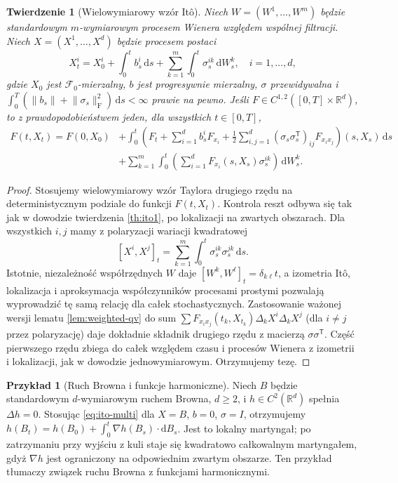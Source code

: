\documentclass[11pt,a4paper,oneside]{report}
\numberwithin{equation}{chapter}
\theoremstyle{plain}
\newtheorem{twierdzenie}{Twierdzenie}[chapter]
\theoremstyle{definition}
\newtheorem{przyklad}{Przykład}[chapter]
\theoremstyle{remark}
\newcommand{\R}{\mathbb{R}}
\newcommand{\calF}{\mathcal{F}}
\newcommand{\dd}{\mathrm{d}}
\newcommand{\norm}[1]{\lVert #1\rVert}
\begin{document}
\begin{twierdzenie}[Wielowymiarowy wzór Itô]\label{thm:volIII:03:04}
\label{th:ito-multi}
Niech $W=(W^1,\ldots,W^m)$ będzie standardowym
$m$-wymiarowym procesem Wienera względem wspólnej
filtracji. Niech $X=(X^1,\ldots,X^d)$ będzie procesem
postaci
\[
X_t^i=X_0^i+\int_0^t b_s^i\,\dd s
+\sum_{k=1}^{m}\int_0^t\sigma_s^{ik}\,\dd W_s^k,
\quad i=1,\ldots,d,
\]
gdzie $X_0$ jest $\calF_0$-mierzalny, $b$ jest
progresywnie mierzalny, $\sigma$ przewidywalna i
$\int_0^T(\norm{b_s}+\norm{\sigma_s}_{\mathrm F}^2)\,\dd s
<\infty$ prawie na pewno. Jeśli
$F\in C^{1,2}([0,T]\times\R^d)$, to z prawdopodobieństwem
jeden, dla wszystkich $t\in[0,T]$,
\[
\begin{split}
F(t,X_t)=F(0,X_0)&+\int_0^t\left(
F_t+\sum_{i=1}^d b_s^iF_{x_i}
+\frac12\sum_{i,j=1}^d(\sigma_s\sigma_s^{\mathsf T})_{ij}
F_{x_ix_j}\right)(s,X_s)\,\dd s\\
&+\sum_{k=1}^m\int_0^t
\left(\sum_{i=1}^dF_{x_i}(s,X_s)\sigma_s^{ik}\right)
\,\dd W_s^k.
\end{split}
\tag{3.6}\label{eq:ito-multi}
\]
\end{twierdzenie}
\begin{proof}
Stosujemy wielowymiarowy wzór Taylora drugiego rzędu
na deterministycznym podziale do funkcji $F(t,X_t)$.
Kontrola reszt odbywa się tak jak w dowodzie twierdzenia
\ref{th:ito1}, po lokalizacji na zwartych obszarach.
Dla wszystkich $i,j$ mamy z polaryzacji wariacji
kwadratowej
\[
[X^i,X^j]_t
=\sum_{k=1}^m\int_0^t\sigma_s^{ik}\sigma_s^{jk}\,\dd s.
\]
Istotnie, niezależność współrzędnych $W$ daje
$[W^k,W^\ell]_t=\delta_{k\ell}t$, a izometria Itô,
lokalizacja i aproksymacja współczynników procesami
prostymi pozwalają wyprowadzić tę samą relację dla
całek stochastycznych. Zastosowanie ważonej wersji
lematu \ref{lem:weighted-qv} do sum
$\sum F_{x_ix_j}(t_k,X_{t_k})\Delta_kX^i\Delta_kX^j$
(dla $i\ne j$ przez polaryzację) daje dokładnie
składnik drugiego rzędu z macierzą $\sigma\sigma^{\mathsf T}$.
Część pierwszego rzędu zbiega do całek względem czasu
i procesów Wienera z izometrii i lokalizacji, jak w
dowodzie jednowymiarowym. Otrzymujemy tezę.
\end{proof}

\begin{przyklad}[Ruch Browna i funkcje harmoniczne]
Niech $B$ będzie standardowym $d$-wymiarowym ruchem
Browna, $d\ge2$, i $h\in C^2(\R^d)$ spełnia
$\Delta h=0$. Stosując \eqref{eq:ito-multi} dla
$X=B$, $b=0$, $\sigma=I$, otrzymujemy
$h(B_t)=h(B_0)+\int_0^t\nabla h(B_s)\cdot\dd B_s$.
Jest to lokalny martyngał; po zatrzymaniu przy wyjściu
z kuli staje się kwadratowo całkowalnym martyngałem,
gdyż $\nabla h$ jest ograniczony na odpowiednim
zwartym obszarze. Ten przykład tłumaczy związek
ruchu Browna z funkcjami harmonicznymi.
\end{przyklad}
\end{document}

